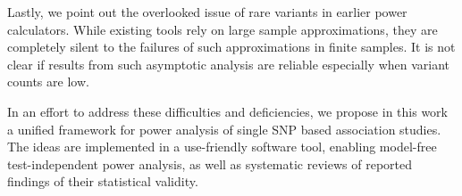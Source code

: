 Lastly, we point out the overlooked issue of rare variants in earlier power calculators.
While existing tools rely on large sample approximations, they are completely silent to the failures of such approximations in finite samples.
It is not clear if results from such asymptotic analysis are reliable especially when variant counts are low.

In an effort to address these difficulties and deficiencies, we propose in this work a unified framework for power analysis of single SNP based association studies.
The ideas are implemented in a use-friendly software tool, enabling model-free test-independent power analysis, as well as systematic reviews of reported findings of their statistical validity.
